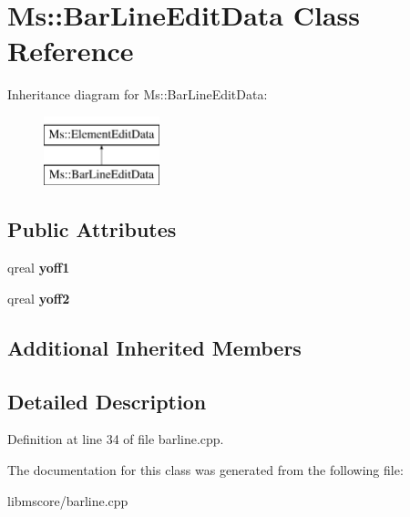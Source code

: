 \hypertarget{class_ms_1_1_bar_line_edit_data}{}\section{Ms\+:\+:Bar\+Line\+Edit\+Data Class Reference}
\label{class_ms_1_1_bar_line_edit_data}
Inheritance diagram for Ms\+:\+:Bar\+Line\+Edit\+Data\+:\begin{figure}[H]
\begin{center}
\leavevmode
\includegraphics[height=2.000000cm]{class_ms_1_1_bar_line_edit_data}
\end{center}
\end{figure}
\subsection*{Public Attributes}
\begin{DoxyCompactItemize}
\item 
\mbox{\label{class_ms_1_1_bar_line_edit_data_a6cf1f4d89fd8144043d5f773feb977aa}} 
qreal {\bfseries yoff1}
\item 
\mbox{\label{class_ms_1_1_bar_line_edit_data_a554031b2c2c9ec92fc3c1d93a5e40e6a}} 
qreal {\bfseries yoff2}
\end{DoxyCompactItemize}
\subsection*{Additional Inherited Members}


\subsection{Detailed Description}


Definition at line 34 of file barline.\+cpp.



The documentation for this class was generated from the following file\+:\begin{DoxyCompactItemize}
\item 
libmscore/barline.\+cpp\end{DoxyCompactItemize}
